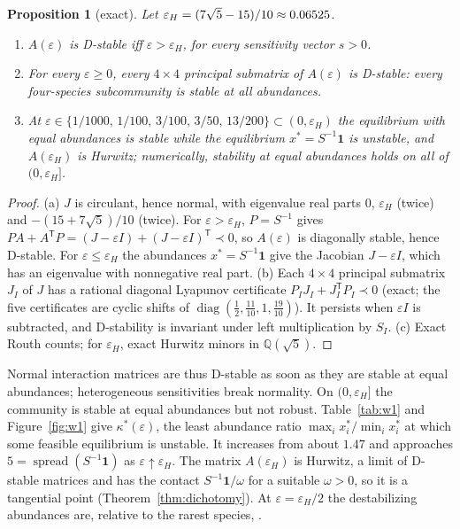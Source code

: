 \documentclass[11pt,a4paper]{article}
\theoremstyle{plain}
\newtheorem{proposition}[theorem]{Proposition}
\theoremstyle{definition}
\newcommand{\diag}{\operatorname{diag}}
\newcommand{\spread}{\operatorname{spread}}
\newcommand{\ks}{\kappa^{*}}
\begin{document}
\begin{proposition}[exact]\label{prop:w1}
Let $\varepsilon_H=(7\sqrt5-15)/10\approx0.06525$.
\begin{enumerate}[label=(\alph*)]
\item $A(\varepsilon)$ is D-stable iff $\varepsilon>\varepsilon_H$, for every sensitivity vector $s>0$.
\item For every $\varepsilon\ge0$, every $4\times4$ principal submatrix of $A(\varepsilon)$ is D-stable: every
four-species subcommunity is stable at all abundances.
\item At $\varepsilon\in\{1/1000,\,1/100,\,3/100,\,3/50,\,13/200\}\subset(0,\varepsilon_H)$ the equilibrium with equal
abundances is stable while the equilibrium $x^{*}=S^{-1}\mathbf 1$ is unstable, and $A(\varepsilon_H)$ is Hurwitz;
numerically, stability at equal abundances holds on all of $(0,\varepsilon_H]$.
\end{enumerate}
\end{proposition}

\begin{proof}
(a) $J$ is circulant, hence normal, with eigenvalue real parts $0$, $\varepsilon_H$ (twice) and
$-(15+7\sqrt5)/10$ (twice). For $\varepsilon>\varepsilon_H$, $P=S^{-1}$ gives
$PA+A^{\mathsf T}P=(J-\varepsilon I)+(J-\varepsilon I)^{\mathsf T}\prec0$, so $A(\varepsilon)$ is diagonally stable,
hence D-stable. For $\varepsilon\le\varepsilon_H$ the abundances $x^{*}=S^{-1}\mathbf 1$ give the Jacobian
$J-\varepsilon I$, which has an eigenvalue with nonnegative real part. (b) Each $4\times4$ principal submatrix $J_I$ of $J$ has a rational diagonal
Lyapunov certificate $P_IJ_I+J_I^{\mathsf T}P_I\prec0$ (exact; the five certificates are cyclic shifts of
$\diag(\tfrac12,\tfrac{11}{10},1,\tfrac{19}{10})$). It persists when $\varepsilon I$ is subtracted, and D-stability is
invariant under left multiplication by $S_I$. (c) Exact Routh counts; for $\varepsilon_H$, exact Hurwitz minors in
$\mathbb Q(\sqrt5)$.
\end{proof}

Normal interaction matrices are thus D-stable as soon as they are stable at equal abundances; heterogeneous
sensitivities break normality. On $(0,\varepsilon_H]$ the community is stable at equal abundances but not robust.
Table~\ref{tab:w1} and Figure~\ref{fig:w1} give $\ks(\varepsilon)$, the least abundance ratio
$\max_ix_i^{*}/\min_ix_i^{*}$ at which some feasible equilibrium is unstable. It increases from about $1.47$ and
approaches $5=\spread(S^{-1}\mathbf 1)$ as $\varepsilon\uparrow\varepsilon_H$. The matrix $A(\varepsilon_H)$ is Hurwitz,
a limit of D-stable matrices and has the contact $S^{-1}\mathbf 1/\omega$ for a suitable $\omega>0$, so it is a
tangential point (Theorem~\ref{thm:dichotomy}). At $\varepsilon=\varepsilon_H/2$ the destabilizing abundances are, relative to the
rarest species, \WonePattern.
\end{document}
